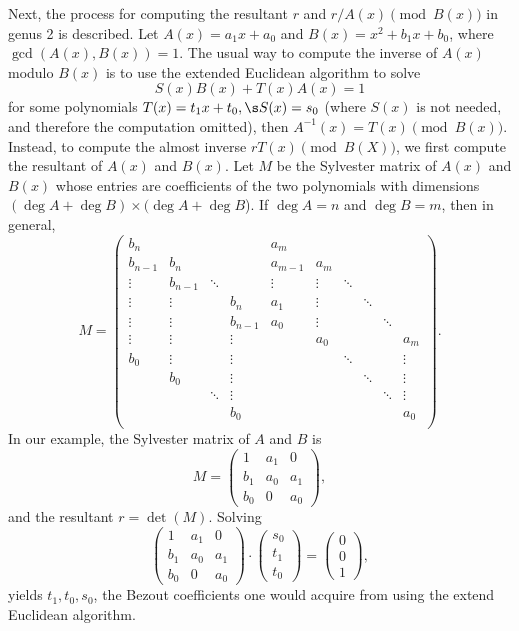 Next, the process for computing the resultant $r$ and $r/A(x) \pmod{B(x)}$ in
genus 2 is described. Let $A(x) = a_1x + a_0$ and $B(x) = x^2 + b_1x + b_0$,
where $\gcd (A(x),B(x)) = 1$. The usual way to compute the inverse of $A(x)$
modulo $B(x)$ is to use the extended Euclidean algorithm to solve $$ S(x)B(x) +
T(x)A(x) = 1$$ for some polynomials $T(x) = t_1x + t_0, \s S(x) = s_0$ (where
$S(x)$ is not needed, and therefore the computation omitted), then $A^{-1}(x) =
T(x) \pmod{B(x)}$.  Instead, to compute the almost inverse $rT(x) \pmod{B(X)}$,
we first compute the resultant of $A(x)$ and $B(x)$. Let $M$ be the Sylvester
matrix of $A(x)$ and $B(x)$ whose entries are coefficients of the two polynomials with dimensions
$(\deg A + \deg B) \times (\deg A + \deg B$). If $\deg A = n$ and $\deg B =m$,
then in general,
$$ M =   \left( \begin{array}{cccccccccc}
b_n     &         &        &        &a_m    &        &        &    	   &    	&		\\
b_{n-1} & b_n     &        &        &a_{m-1}& a_m    &        &    	   &		&		\\
\vdots  & b_{n-1} & \ddots &        &\vdots & \vdots & \ddots & 	   &		&		\\
\vdots  & \vdots  &        & b_n    &a_1    & \vdots &        & \ddots &		&		\\
\vdots  & \vdots  &		   & b_{n-1}&a_0    & \vdots &		  &		   & \ddots &		\\
\vdots  & \vdots  &        & \vdots &		& a_0    &		  &		   &		& a_m	\\
b_0     & \vdots  &		   & \vdots &		& 		 & \ddots &		   &		& \vdots\\
        & b_0     &        & \vdots &		&		 &		  & \ddots & 		& \vdots\\
        &         & \ddots & \vdots &		&		 &		  &        & \ddots & \vdots\\
        &         &        & b_0    &		&		 &        &		   &		& a_0	\\
\end{array} \right).$$ In our example, the Sylvester matrix of $A$ and $B$ is
$$ M =   \left( \begin{array}{ccc}
1   & a_1 & 0  \\
b_1 & a_0 & a_1  \\
b_0 & 0   & a_0  \end{array} \right),$$ and the resultant $r = \det (M).$ Solving 
$$\left( \begin{array}{ccc}
1   & a_1 & 0  \\
b_1 & a_0 & a_1  \\
b_0 & 0   & a_0  \end{array} \right) \cdot \left( \begin{array}{c}
s_0     \\
t_1   \\
t_0   \end{array} \right) = \left( \begin{array}{c}
0 \\
0 \\
1 \end{array} \right), $$ yields $t_1, t_0,s_0$, the Bezout coefficients one
would acquire from using the extend Euclidean algorithm. 

